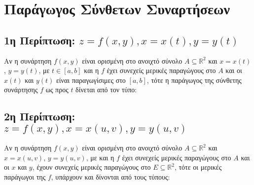 \chapter{Παράγωγος Σύνθετων Συναρτήσεων}

\section{1η Περίπτωση: \ensuremath{z=f(x,y),  x=x(t),  y=y(t)}} 

\begin{thm}
  Αν η συνάρτηση $ f(x,y) $ είναι ορισμένη στο ανοιχτό σύνολο 
  $ A \subseteq \mathbb{R}^{2} $ και $ x = x(t) $, $ y=y(t) $, με 
  $ t \in [a,b] $ και η $f$ έχει συνεχείς μερικές 
  παραγώγους στο $A$ και οι $ x(t) $ και $ y(t) $ είναι παραγωγίσιμες στο 
  $ [a,b] $, τότε η παράγωγος της σύνθετης συνάρτησης $f$ ως προς $t$ δίνεται από 
  τον τύπο:

  \vspace{\baselineskip}

\end{thm}

\section{2η Περίπτωση: \ensuremath{z=f(x,y),  x=x(u,v),  y=y(u,v)}} 

\begin{thm}
  Αν η συνάρτηση $ f(x,y) $ είναι ορισμένη στο ανοιχτό σύνολο 
  $ A \subseteq \mathbb{R}^{2} $ και $ x = x(u,v) $, $ y=y(u,v) $, με 
  και η $f$ έχει συνεχείς μερικές παραγώγους στο $A$ και οι $ x $ και $ y $, έχουν 
  συνεχείς μερικές παραγώγους στο $ E \subseteq \mathbb{R}^{2} $,
  τότε οι μερικές παράγωγοι της $f$, υπάρχουν και δίνονται από τους τύπους:
\end{thm}

